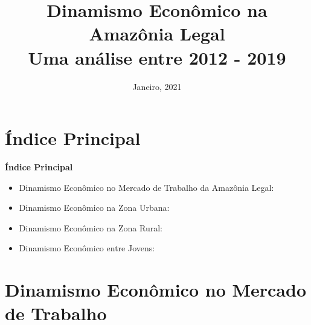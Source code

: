 \documentclass[10pt]{beamer}
\date{Janeiro, 2021}
\title{Dinamismo Econômico na Amazônia Legal \\ Uma análise entre 2012 - 2019}
\begin{document}

\begin{frame}
\titlepage
\end{frame}


\section{Índice Principal}

\begin{frame}[label=indice_principal]{}

\textbf{Índice Principal}
\vspace{2mm}
\begin{itemize}

\item{Dinamismo Econômico no Mercado de Trabalho da Amazônia Legal: \hyperlink{indice_principal_amz}{}}
\vspace{1mm}

\item{Dinamismo Econômico na Zona Urbana: \hyperlink{indice_principal_amz_urbana}{}}
\vspace{1mm}

\item{Dinamismo Econômico na Zona Rural: \hyperlink{indice_principal_amz_rural}{}}
\vspace{1mm}

\item{Dinamismo Econômico entre Jovens: \hyperlink{indice_principal_amz_jovem}{}}
\vspace{1mm}

\end{itemize}

\end{frame}

\section{Dinamismo Econômico no Mercado de Trabalho}
\end{document}
